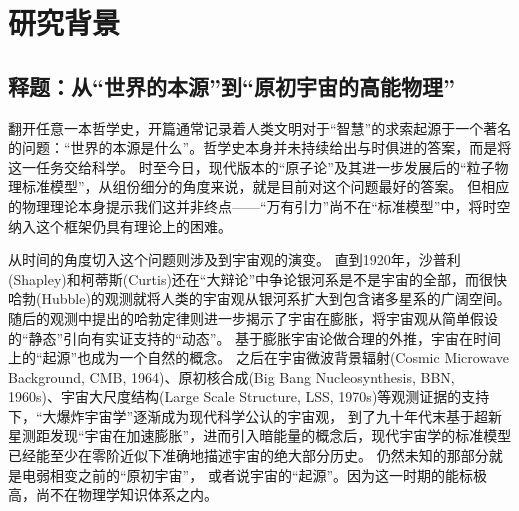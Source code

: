 
\chapter{研究背景}

\section{释题：从“世界的本源”到“原初宇宙的高能物理”}

翻开任意一本哲学史，开篇通常记录着人类文明对于“智慧”的求索起源于一个著名的问题：“世界的本源是什么”。哲学史本身并未持续给出与时俱进的答案，而是将这一任务交给科学。
时至今日，现代版本的“原子论”及其进一步发展后的“粒子物理标准模型”，从组份细分的角度来说，就是目前对这个问题最好的答案。
但相应的物理理论本身提示我们这并非终点——“万有引力”尚不在“标准模型”中，将时空纳入这个框架仍具有理论上的困难。

从时间的角度切入这个问题则涉及到宇宙观的演变。
直到1920年，沙普利(Shapley)和柯蒂斯(Curtis)还在“大辩论”中争论银河系是不是宇宙的全部，而很快哈勃(Hubble)的观测就将人类的宇宙观从银河系扩大到包含诸多星系的广阔空间。%
随后的观测中提出的哈勃定律则进一步揭示了宇宙在膨胀，将宇宙观从简单假设的“静态”引向有实证支持的“动态”。%
基于膨胀宇宙论做合理的外推，宇宙在时间上的“起源”也成为一个自然的概念。
之后在宇宙微波背景辐射(Cosmic Microwave Background, CMB, 1964)、原初核合成(Big Bang Nucleosynthesis, BBN, 1960s)、宇宙大尺度结构(Large Scale Structure, LSS, 1970s)等观测证据的支持下，“大爆炸宇宙学”逐渐成为现代科学公认的宇宙观，
到了九十年代末基于超新星测距发现“宇宙在加速膨胀”，进而引入暗能量的概念后，现代宇宙学的标准模型已经能至少在零阶近似下准确地描述宇宙的绝大部分历史。
仍然未知的那部分就是电弱相变之前的“原初宇宙”，%
或者说宇宙的“起源”。因为这一时期的能标极高，尚不在物理学知识体系之内。

